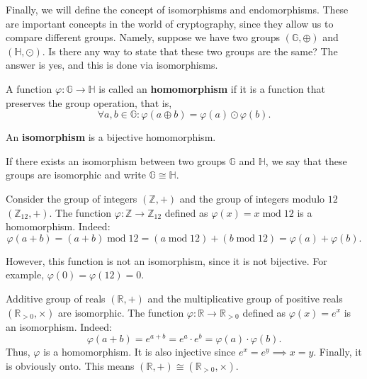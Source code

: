 \documentclass[../lecture-notes.tex]{subfiles}
\begin{document}
Finally, we will define the concept of isomorphisms and endomorphisms. These are important concepts in the world of cryptography, since they allow us to compare different groups. Namely, 
suppose we have two groups $(\mathbb{G},\oplus)$ and $(\mathbb{H}, \odot)$. Is there any way to state that these two groups are the same? The answer is yes, and this is done via isomorphisms.

\begin{definition}
    A function $\varphi: \mathbb{G} \to \mathbb{H}$ is called an \textbf{homomorphism} if it is a function that preserves the group operation, that is, 
    \begin{equation}
        \forall a,b \in \mathbb{G}: \varphi(a \oplus b) = \varphi(a) \odot \varphi(b).
    \end{equation}
\end{definition}

\begin{definition}
    An \textbf{isomorphism} is a bijective homomorphism.
\end{definition}

\begin{definition}
    If there exists an isomorphism between two groups $\mathbb{G}$ and $\mathbb{H}$, we say that these groups are isomorphic and write $\mathbb{G} \cong \mathbb{H}$.
\end{definition}

\begin{example}
    Consider the group of integers $(\mathbb{Z},+)$ and the group of integers modulo $12$ $(\mathbb{Z}_{12},+)$. The function $\varphi: \mathbb{Z} \to \mathbb{Z}_{12}$ defined as $\varphi(x) = x \;\text{mod}\; 12$ is a homomorphism. Indeed:
    \begin{equation}
        \varphi(a+b) = (a+b) \;\text{mod}\; 12 = (a \;\text{mod}\; 12) + (b \;\text{mod}\; 12) = \varphi(a) + \varphi(b).
    \end{equation}

    However, this function is not an isomorphism, since it is not bijective. For example, $\varphi(0) = \varphi(12) = 0$.
\end{example}

\begin{example}
    Additive group of reals $(\mathbb{R}, +)$ and the multiplicative group of positive reals $(\mathbb{R}_{>0}, \times)$ are isomorphic. The function $\varphi: \mathbb{R} \to \mathbb{R}_{>0}$ defined as $\varphi(x) = e^x$ is an isomorphism. Indeed:
    \begin{equation}
        \varphi(a+b) = e^{a+b} = e^a \cdot e^b = \varphi(a) \cdot \varphi(b).
    \end{equation}
    Thus, $\varphi$ is a homomorphism. It is also injective since $e^x = e^y \implies x=y$. Finally, it is obviously onto. This means $(\mathbb{R}, +) \cong (\mathbb{R}_{>0}, \times)$.
\end{example}
\end{document}
